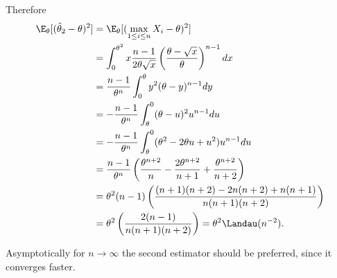 \begin{solution}
\begin{enumerate}[label = (\alph*)]
  Therefore
  \begin{align*}
    \E_\theta[(\hat{\theta}_2 - \theta)^2] &= \E_\theta[(\max_{1 \leq i \leq n} X_i - \theta)^2] \\
    &= \int_0^{\theta^2} x\frac{n-1}{2\theta\sqrt{x}}\left(\frac{\theta - \sqrt{x}}{\theta}\right)^{n-1} dx \\
    &= \frac{n-1}{\theta^n}\int_0^{\theta} y^2(\theta - y)^{n-1} dy \\
    &= -\frac{n-1}{\theta^n}\int_\theta^{0} (\theta - u)^2u^{n-1} du \\
    &= -\frac{n-1}{\theta^n}\int_\theta^{0} (\theta^2 - 2\theta u + u^2)u^{n-1} du \\
    &= \frac{n-1}{\theta^n}\left(\frac{\theta^{n+2}}{n} -
    \frac{2\theta^{n+2}}{n+1} + \frac{\theta^{n+2}}{n+2}\right) \\
    &= \theta^2(n-1)\left(\frac{(n+1)(n+2) - 2n(n+2) + n(n+1)}{n(n+1)(n+2)}\right) \\
    &= \theta^2\left(\frac{2(n-1)}{n(n+1)(n+2)}\right) = \theta^2 \Landau(n^{-2}).
  \end{align*}

  Asymptotically for $n \to \infty$ the second estimator should be preferred, since
  it converges faster.
\end{enumerate}

\end{solution}

